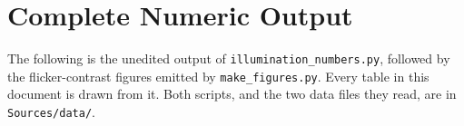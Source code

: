 \FloatBarrier

\chapter{Complete Numeric Output}
\label{app:numeric}

The following is the unedited output of \texttt{illumination\_numbers.py}, followed by the flicker-contrast figures emitted by \texttt{make\_figures.py}. Every table in this document is drawn from it. Both scripts, and the two data files they read, are in \texttt{Sources/data/}.

{\scriptsize}
